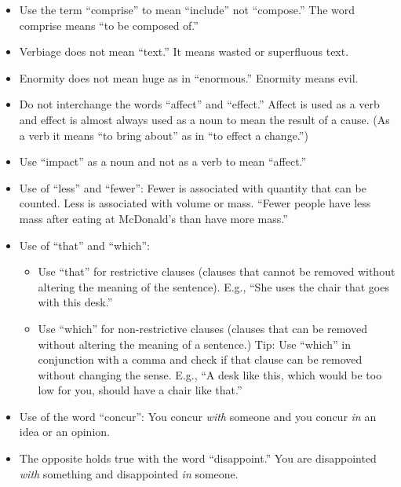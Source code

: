 \begin{itemize}
\item Use the term ``comprise'' to mean ``include'' not ``compose.'' The word comprise means ``to be composed of.''
\item Verbiage does not mean ``text.'' It means wasted or superfluous text.
\item Enormity does not mean huge as in ``enormous.'' Enormity means evil.
\item Do not interchange the words ``affect'' and ``effect.'' Affect is used as a verb and effect is almost always used as a noun to mean the result of a cause. (As a verb it means ``to bring about'' as in ``to effect a change.'') 
\item Use ``impact'' as a noun and not as a verb to mean ``affect.''
\item Use of ``less'' and ``fewer'': Fewer is associated with quantity that can be counted. Less is associated with volume or mass. ``Fewer people have less mass after eating at McDonald's than have more mass.''
\item Use of ``that'' and ``which'': 
\begin{itemize}
\item Use ``that'' for restrictive clauses (clauses that cannot be removed without altering the meaning of the sentence). E.g., ``She uses the chair that goes with this desk.''
\item Use ``which'' for non-restrictive clauses (clauses that can be removed without altering the meaning of a sentence.) Tip: Use ``which'' in conjunction with a comma and check if that clause can be removed without changing the sense.  E.g., ``A desk like this, which would be too low for you, should have a chair like that.''
\end{itemize}
\item Use of the word ``concur'': You concur \emph{with} someone and you concur \emph{in} an idea or an opinion. 
\item The opposite holds true with the word ``disappoint.'' You are disappointed \emph{with} something and disappointed \emph{in} someone.
\end{itemize}



